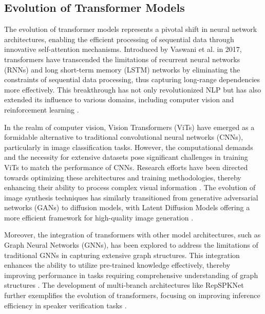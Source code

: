 \subsection{Evolution of Transformer Models} \label{subsec:Evolution of Transformer Models}

The evolution of transformer models represents a pivotal shift in neural network architectures, enabling the efficient processing of sequential data through innovative self-attention mechanisms. Introduced by Vaswani et al. in 2017, transformers have transcended the limitations of recurrent neural networks (RNNs) and long short-term memory (LSTM) networks by eliminating the constraints of sequential data processing, thus capturing long-range dependencies more effectively. This breakthrough has not only revolutionized NLP but has also extended its influence to various domains, including computer vision and reinforcement learning \cite{wang2023environmenttransformerpolicyoptimization}.



In the realm of computer vision, Vision Transformers (ViTs) have emerged as a formidable alternative to traditional convolutional neural networks (CNNs), particularly in image classification tasks. However, the computational demands and the necessity for extensive datasets pose significant challenges in training ViTs to match the performance of CNNs. Research efforts have been directed towards optimizing these architectures and training methodologies, thereby enhancing their ability to process complex visual information \cite{le2019evolvingselfsupervisedneuralnetworks}. The evolution of image synthesis techniques has similarly transitioned from generative adversarial networks (GANs) to diffusion models, with Latent Diffusion Models offering a more efficient framework for high-quality image generation \cite{dhariwal2021diffusion}.



Moreover, the integration of transformers with other model architectures, such as Graph Neural Networks (GNNs), has been explored to address the limitations of traditional GNNs in capturing extensive graph structures. This integration enhances the ability to utilize pre-trained knowledge effectively, thereby improving performance in tasks requiring comprehensive understanding of graph structures \cite{shin2018deepvesselsegmentationlearning}. The development of multi-branch architectures like RepSPKNet further exemplifies the evolution of transformers, focusing on improving inference efficiency in speaker verification tasks \cite{ma2021repworksspeakerverification}.



